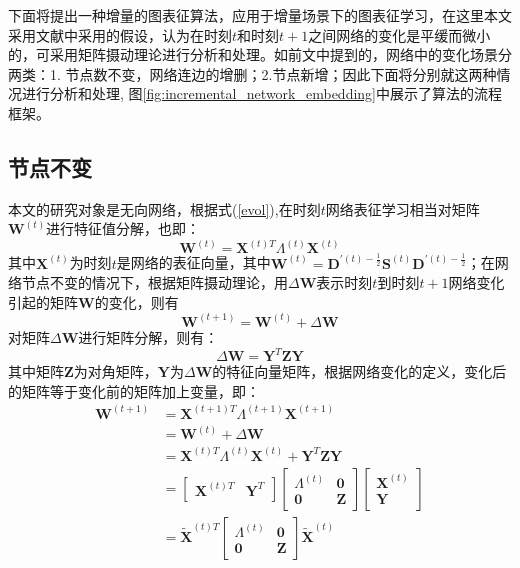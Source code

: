 下面将提出一种增量的图表征算法，应用于增量场景下的图表征学习，在这里本文采用文献\cite{chi2007evolutionary}中采用的假设，认为在时刻$t$和时刻$t+1$之间网络的变化是平缓而微小的，可采用矩阵摄动理论\cite{stewart1990matrix}进行分析和处理。如前文中提到的，网络中的变化场景分两类：1. 节点数不变，网络连边的增删；2.节点新增；因此下面将分别就这两种情况进行分析和处理,
图\ref{fig:incremental_network_embedding}中展示了算法的流程框架。

\subsection{节点不变}
本文的研究对象是无向网络，根据式(\ref{evol}),在时刻$t$网络表征学习相当对矩阵$\textbf{W}^{(t)}$进行特征值分解，也即：
\begin{equation}
	\textbf{W}^{(t)} = \textbf{X}^{(t)T} \Lambda^{(t)} \textbf{X} ^{(t)}
\end{equation}
其中$\textbf{X} ^{(t)}$为时刻$t$是网络的表征向量，其中$\textbf{W}^{(t)} = \textbf{D}^{\prime(t)-\frac{1}{2}}\textbf{S}^{(t)}\textbf{D}^{\prime(t)-\frac{1}{2}}$；在网络节点不变的情况下，根据矩阵摄动理论\cite{stewart1990matrix}，用$\Delta\textbf{W}$表示时刻$t$到时刻$t+1$网络变化引起的矩阵$\textbf{W}$的变化，则有
\begin{equation}
	\textbf{W}^{(t+1)} = \textbf{W}^{(t)} + \Delta\textbf{W}
\end{equation}
对矩阵$\Delta\textbf{W}$进行矩阵分解，则有：
\begin{equation}
	\Delta\textbf{W} =  \textbf{Y}^{T} \textbf{Z}  \textbf{Y}
\end{equation}
其中矩阵$\textbf{Z}$为对角矩阵，$\textbf{Y}$为$\Delta\textbf{W}$的特征向量矩阵，根据网络变化的定义，变化后的矩阵等于变化前的矩阵加上变量，即：
\begin{equation}\label{time_t1}
\begin{aligned}
\textbf{W}^{(t+1)} &= \textbf{X}^{(t+1)T} \Lambda^{(t+1)} \textbf{X} ^{(t+1)} \\
 &= \textbf{W}^{(t)} + \Delta \textbf{W} \\
&= \textbf{X}^{(t)T} \Lambda^{(t)} \textbf{X} ^{(t)} +  \textbf{Y}^{T} \textbf{Z}  \textbf{Y} \\
&= \begin{bmatrix} \textbf{X}^{(t)T} & \textbf{Y}^{T}\end{bmatrix}
   \begin{bmatrix}  \Lambda^{(t)} & \textbf{0}\\
   \textbf{0} & \textbf{Z}
   \end{bmatrix}
   \begin{bmatrix} \textbf{X}^{(t)} \\ \textbf{Y}\end{bmatrix} \\
&= \tilde{\textbf{X}}^{(t)T} 
\begin{bmatrix}  \Lambda^{(t)} & \textbf{0}\\
\textbf{0} & \textbf{Z}
\end{bmatrix}
\tilde{\textbf{X}}^{(t)}
\end{aligned}
\end{equation}
